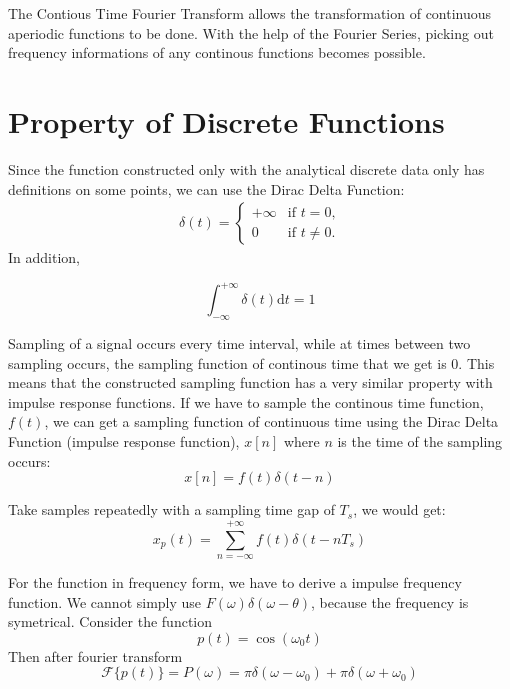\documentclass[12pt]{article}
\begin{document}
\indent The Contious Time Fourier Transform allows the transformation of continuous aperiodic functions to be done. 
With the help of the Fourier Series, picking out frequency informations of any continous functions becomes possible.










\section{Property of Discrete Functions}
Since the function constructed only with the analytical discrete data only has definitions on some points, 
we can use the Dirac Delta Function:
\begin{align*}
\delta(t) = \begin{cases}
    +\infty     &\text{if $t = 0$,}    \\
    0           &\text{if $t \neq 0$.}
\end{cases}
\end{align*}
In addition, 

$$\int_{-\infty}^{+\infty} \delta(t) \mathrm{d}t = 1$$

Sampling of a signal occurs every time interval, while at times between two sampling occurs, 
the sampling function of continous time that we get is 0. 
This means that the constructed sampling function has a very similar property with impulse response functions.
If we have to sample the continous time function, $f(t)$, 
we can get a sampling function of continuous time using the Dirac Delta Function (impulse response function), 
$x[n]$ where $n$ is the time of the sampling occurs:
$$ x[n]= f(t)\delta(t-n) $$

Take samples repeatedly with a sampling time gap of $T_s$, we would get: 
$$ x_p(t)= \sum_{n=-\infty}^{+\infty} f(t)\delta(t-nT_s) $$

For the function in frequency form, we have to derive a impulse frequency function. 
We cannot simply use $F(\omega)\delta(\omega - \theta)$, because the frequency is symetrical. 
Consider the function $$ p(t) = \cos(\omega_0t) $$ Then after fourier transform 
$$ \mathcal{F}\{p(t)\} = P(\omega) = \pi\delta(\omega-\omega_0) + \pi\delta(\omega+\omega_0)$$
\end{document}

